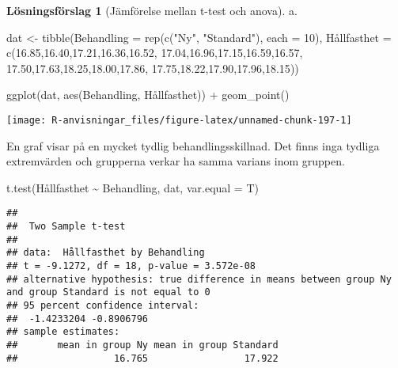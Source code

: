\documentclass[
]{book}
\newenvironment{Shaded}{\begin{snugshade}}{\end{snugshade}}
\newcommand{\AttributeTok}[1]{\textcolor[rgb]{0.77,0.63,0.00}{#1}}
\newcommand{\DecValTok}[1]{\textcolor[rgb]{0.00,0.00,0.81}{#1}}
\newcommand{\FloatTok}[1]{\textcolor[rgb]{0.00,0.00,0.81}{#1}}
\newcommand{\FunctionTok}[1]{\textcolor[rgb]{0.00,0.00,0.00}{#1}}
\newcommand{\NormalTok}[1]{#1}
\newcommand{\OtherTok}[1]{\textcolor[rgb]{0.56,0.35,0.01}{#1}}
\newcommand{\SpecialCharTok}[1]{\textcolor[rgb]{0.00,0.00,0.00}{#1}}
\newcommand{\StringTok}[1]{\textcolor[rgb]{0.31,0.60,0.02}{#1}}
\theoremstyle{definition}
\theoremstyle{definition}
\theoremstyle{definition}
\theoremstyle{definition}
\newtheorem{hypothesis}{Lösningsförslag}[chapter]
\theoremstyle{remark}
\begin{document}
\begin{hypothesis}[Jämförelse mellan t-test och anova]
a.

\begin{Shaded}
\begin{Highlighting}[]
\NormalTok{dat }\OtherTok{\textless{}{-}} \FunctionTok{tibble}\NormalTok{(}\AttributeTok{Behandling =} \FunctionTok{rep}\NormalTok{(}\FunctionTok{c}\NormalTok{(}\StringTok{"Ny"}\NormalTok{, }\StringTok{"Standard"}\NormalTok{), }\AttributeTok{each =} \DecValTok{10}\NormalTok{),}
\NormalTok{              Hållfasthet }\OtherTok{=} \FunctionTok{c}\NormalTok{(}\FloatTok{16.85}\NormalTok{,}\FloatTok{16.40}\NormalTok{,}\FloatTok{17.21}\NormalTok{,}\FloatTok{16.36}\NormalTok{,}\FloatTok{16.52}\NormalTok{,}
                              \FloatTok{17.04}\NormalTok{,}\FloatTok{16.96}\NormalTok{,}\FloatTok{17.15}\NormalTok{,}\FloatTok{16.59}\NormalTok{,}\FloatTok{16.57}\NormalTok{,}
                              \FloatTok{17.50}\NormalTok{,}\FloatTok{17.63}\NormalTok{,}\FloatTok{18.25}\NormalTok{,}\FloatTok{18.00}\NormalTok{,}\FloatTok{17.86}\NormalTok{,}
                              \FloatTok{17.75}\NormalTok{,}\FloatTok{18.22}\NormalTok{,}\FloatTok{17.90}\NormalTok{,}\FloatTok{17.96}\NormalTok{,}\FloatTok{18.15}\NormalTok{))}

\FunctionTok{ggplot}\NormalTok{(dat, }\FunctionTok{aes}\NormalTok{(Behandling, Hållfasthet)) }\SpecialCharTok{+}
  \FunctionTok{geom\_point}\NormalTok{()}
\end{Highlighting}
\end{Shaded}

\begin{center}\texttt{[image: R-anvisningar\_files/figure-latex/unnamed-chunk-197-1]} \end{center}

En graf visar på en mycket tydlig behandlingsskillnad. Det finns inga tydliga extremvärden och grupperna verkar ha samma varians inom gruppen.

\begin{Shaded}
\begin{Highlighting}[]
\FunctionTok{t.test}\NormalTok{(Hållfasthet }\SpecialCharTok{\textasciitilde{}}\NormalTok{ Behandling, dat, }\AttributeTok{var.equal =}\NormalTok{ T)}
\end{Highlighting}
\end{Shaded}

\begin{verbatim}
## 
##  Two Sample t-test
## 
## data:  Hållfasthet by Behandling
## t = -9.1272, df = 18, p-value = 3.572e-08
## alternative hypothesis: true difference in means between group Ny and group Standard is not equal to 0
## 95 percent confidence interval:
##  -1.4233204 -0.8906796
## sample estimates:
##       mean in group Ny mean in group Standard 
##                 16.765                 17.922
\end{verbatim}


\end{hypothesis}
\end{document}
